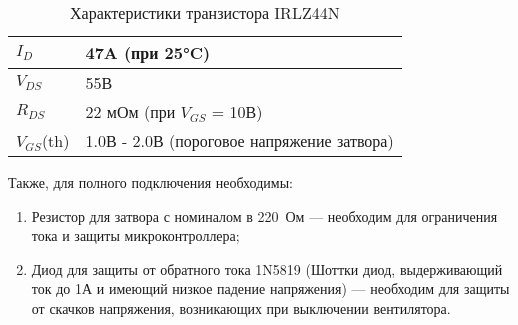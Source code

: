 \begin{table}[h!]
	\centering
	\caption{Характеристики транзистора IRLZ44N}
	\begin{tabular}{| m{7cm} | m{7cm} |}	
		\hline
			$I_{D}$ &  47A (при 25°C)\\ \hline
			$V_{DS}$ & 55В \\ \hline
			$R_{DS}$ & 22 мОм (при $V_{GS}$ = 10В) \\ \hline
			$V_{GS}$(th) & 1.0В - 2.0В (пороговое напряжение затвора) \\ \hline
	\end{tabular}
	\label{tab::MosfetCharacteristics}
\end{table}

Также, для полного подключения необходимы:

\begin{enumerate}

	\item Резистор для затвора с номиналом в 220~Ом --- необходим для ограничения тока и защиты микроконтроллера;
	
	\item Диод для защиты от обратного тока 1N5819 (Шоттки диод, выдерживающий ток до 1А и имеющий низкое падение напряжения) --- необходим для защиты от скачков напряжения, возникающих при выключении вентилятора.

\end{enumerate}
